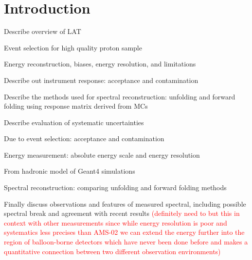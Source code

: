 \documentclass{article}
\begin{document}
\section{Introduction}
	\begin{myEnumerate}
		\item Describe overview of LAT
		\item Event selection for high quality proton sample
		\item Energy reconstruction, biases, energy resolution, and limitations
		\item Describe out instrument response: acceptance and contamination
		\item Describe the methods used for spectral reconstruction: unfolding and forward folding using response matrix derived from MCs
		\item Describe evaluation of systematic uncertainties
		\begin{myEnumerate}
			\item Due to event selection: acceptance and contamination
			\item Energy measurement: absolute energy scale and energy resolution
			\item From hadronic model of Geant4 simulations
			\item Spectral reconstruction: comparing unfolding and forward folding methods
		\end{myEnumerate}
		\item Finally discuss observations and features of measured spectral, including possible spectral break and agreement with recent results \textcolor{red}{(definitely need to but this in context with other measurements since while energy resolution is poor and systematics less precises than AMS-02 we can extend the energy further into the region of balloon-borne detectors which have never been done before and makes a quantitative connection between two different observation environments)}
	\end{myEnumerate}
\end{document}
